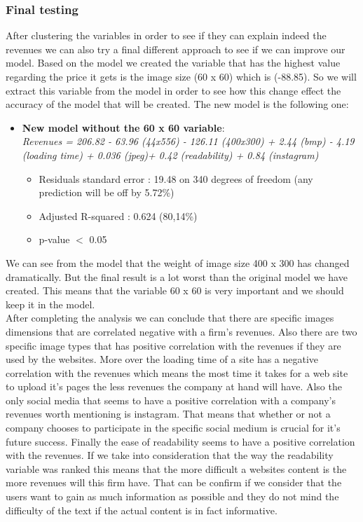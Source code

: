 \documentclass{book}
\begin{document}
\subsubsection{Final testing}
After clustering the variables in order to see if they can explain indeed the revenues we can also try a final different approach to see if we can improve our model. Based on the model we created the variable that has the highest value regarding the price it gets is the image size (60 x 60) which is (-88.85). So we will extract this variable from the model in order to see how this change effect the accuracy of the model that will be created. The new model is the following one:
\begin{itemize}
\item \textbf{New model without the 60 x 60 variable}:\\
\textit{Revenues = 206.82 - 63.96 (44x556) - 126.11 (400x300) + 2.44 (bmp) - 4.19 (loading time) + 0.036 (jpeg)+ 0.42 (readability) + 0.84 (instagram) }
\begin{itemize}
\item Residuals standard error : 19.48 on 340 degrees of freedom (any prediction will be off by 5.72\%)
\item Adjusted R-squared : 0.624 (80,14\%)
\item p-value $<$ 0.05
\end{itemize}
\end{itemize}
We can see from the model that the weight of image size 400 x 300 has changed dramatically. But the final result is a lot worst than the original model we have created. This means that the variable 60 x 60 is very important and we should keep it in the model.\\
After completing the analysis we can conclude that there are specific images dimensions that are correlated negative with a firm's revenues. Also there are two specific image types that has positive correlation with the revenues if they are used by the websites. More over the loading time of a site has a negative correlation with the revenues which means the most time it takes for a web site to upload it's pages the less revenues the company at hand will have. Also the only social media that seems to have a positive correlation with a company's revenues worth mentioning is instagram. That means that whether or not a company chooses to participate in the specific social medium is crucial for it's future success. Finally the ease of readability seems to have a positive correlation with the revenues. If we take into consideration that the way the readability variable was ranked this means that the more difficult a websites content is the more revenues will this firm have. That can be confirm if we consider that the users want to gain as much information as possible and they do not mind the difficulty of the text if the actual content is in fact informative.
\pagebreak  
\end{document}
